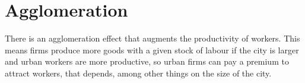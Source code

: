 
\section{Agglomeration}
There is an agglomeration effect that augments the productivity of workers. This means firms produce more goods with a given stock of labour if the city is larger and urban workers are more productive, %
so urban firms can pay a premium to attract workers, that depends, among other things on the size of the city. %



